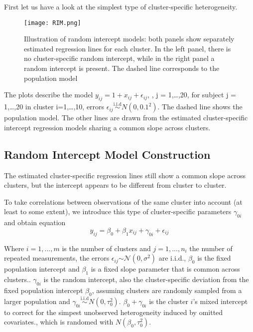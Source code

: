 \documentclass[a4paper,11pt]{article}
\begin{document}
First let us have a look at the simplest type of cluster-specific heterogeneity.
\begin{figure}[ht]
	\centering
	\texttt{[image: RIM.png]}
	\caption{Illustration of random intercept models: both panels show separately estimated regression lines for each cluster. In the left panel, there is no cluster-specific random intercept, while in the right panel a random intercept is present. The dashed line corresponds to the population model}
	\label{fig:label}
\end{figure}

The plots describe the model $y_{ij} = 1 + x_{ij} +\epsilon_{ij}$, , j = 1,…,20, for subject j = 1,…,20 in cluster i=1,…,10, errors $\epsilon_{ij} \stackrel{\text{i.i.d}}{\sim} N(0,0.1^2)$. The dashed line shows the population model. The other lines are drawn from the estimated cluster-specific intercept regression models sharing a common slope across clusters.

\subsection{Random Intercept Model Construction}
The estimated cluster-specific regression lines still show a common slope across clusters, but the intercept appears to be different from cluster to cluster.

To take correlations between observations of the same cluster 
into account (at least to some extent), we introduce this type of cluster-specific parameters $\gamma_{0i}$ and obtain equation
\begin{equation}\label{4}
y_{ij} = \beta_0 + \beta_1x_{ij}+\gamma_{0i}+\epsilon_{ij}
\end{equation}

	Where $i=1,...,m$ is the number of clusters and $j=1,...,n_i$ the number of repeated measurements, the errors $\epsilon_{ij}$$\sim\mathcal{N}(0,\sigma^2)$ are i.i.d., $\beta_0$ is the fixed population intercept and $\beta_1$ is a fixed slope parameter that is common across clusters.. $\gamma_{0i}$ is the random intercept, also the cluster-specific deviation from the fixed population intercept $\beta_0$, assuming clusters are randomly
	sampled from a larger population and  $\gamma_{0i} \stackrel{\text{i.i.d}}{\sim}  N(0,\tau_0 ^2)$.   
$\beta_0 + \gamma_{0i}$ is the cluster $i$'s mixed intercept to correct for the simpest unobserved heterogeneity induced by omitted covariates., which is randomed with $N (\beta_0,\tau_0 ^2)$.
\end{document}

